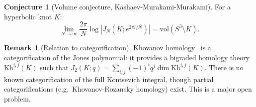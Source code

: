 \documentclass[12pt,a4paper]{amsart}
\theoremstyle{definition}
\newtheorem{remark}[theorem]{Remark}
\newtheorem{conjecture}[theorem]{Conjecture}
\begin{document}
\begin{conjecture}[Volume conjecture, Kashaev-Murakami-Murakami]\label{conj:volume}
For a hyperbolic knot $K$:
\[
  \lim_{N \to \infty} \frac{2\pi}{N} \log |J_N(K; e^{2\pi i/N})| = \mathrm{vol}(S^3 \setminus K).
\]
\end{conjecture}

\begin{remark}[Relation to categorification]
Khovanov homology~\cite{khovanov2000} is a categorification of the Jones
polynomial: it provides a bigraded homology theory $\mathrm{Kh}^{i,j}(K)$
such that $J_2(K;q) = \sum_{i,j} (-1)^i q^j \dim \mathrm{Kh}^{i,j}(K)$.
There is no known categorification of the full Kontsevich integral,
though partial categorifications (e.g.\ Khovanov-Rozansky homology) exist.
This is a major open problem.
\end{remark}
\end{document}

